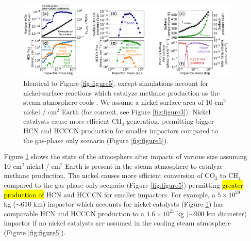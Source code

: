 \begin{figure}
  \centering
  \includegraphics[width=1.0\textwidth]{tex/5impacts/figures/Figure7.pdf}
  \caption{Identical to Figure \ref{fig:figure5}, except simulations account for nickel-surface reactions which catalyze methane production as the steam atmosphere cools \citep{Schmider_2021}. We assume a nickel surface area of 10 cm$^2$ nickel / cm$^2$ Earth (for context, see Figure \ref{fig:figure3}). Nickel catalysts cause more efficient CH$_4$ generation, permitting bigger HCN and HCCCN production for smaller impactors compared to the gas-phase only scenario (Figure \ref{fig:figure5}).}
  \label{fig:figure7}
\end{figure}

Figure \ref{fig:figure7} shows the state of the atmosphere after impacts of various size assuming 10 cm$^2$ nickel / cm$^2$ Earth is present in the steam atmosphere to catalyze methane production. The nickel causes more efficient conversion of CO$_2$ to CH$_4$ compared to the gas-phase only scenario (Figure \ref{fig:figure5}) permitting \hl{greater production of} HCN and HCCCN for smaller impactors. For example, a $5 \times 10^{20}$ kg ($\sim 610$ km) impactor which accounts for nickel catalysts (Figure \ref{fig:figure7}) has comparable HCN and HCCCN production to a $1.6 \times 10^{21}$ kg ($\sim 900$ km diameter) impactor if no nickel catalysts are assumed in the cooling steam atmosphere (Figure \ref{fig:figure5}).

